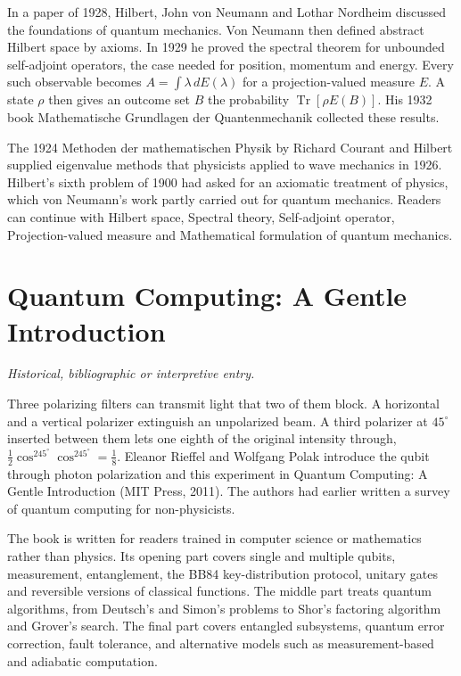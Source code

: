 \documentclass[11pt,oneside]{book}
\begin{document}
In a paper of 1928, Hilbert, John von Neumann and Lothar Nordheim discussed the foundations of quantum mechanics. Von Neumann then defined abstract Hilbert space by axioms. In 1929 he proved the spectral theorem for unbounded self-adjoint operators, the case needed for position, momentum and energy. Every such observable becomes \(A=\int\lambda\,dE(\lambda)\) for a projection-valued measure \(E\). A state \(\rho\) then gives an outcome set \(B\) the probability \(\operatorname{Tr}[\rho E(B)]\). His 1932 book Mathematische Grundlagen der Quantenmechanik collected these results.

The 1924 Methoden der mathematischen Physik by Richard Courant and Hilbert supplied eigenvalue methods that physicists applied to wave mechanics in 1926. Hilbert's sixth problem of 1900 had asked for an axiomatic treatment of physics, which von Neumann's work partly carried out for quantum mechanics. Readers can continue with Hilbert space, Spectral theory, Self-adjoint operator, Projection-valued measure and Mathematical formulation of quantum mechanics.







\clearpage

\section{Quantum Computing: A Gentle Introduction}

\label{topic:quantum-computing-a-gentle-introduction}

\par\smallskip\noindent\textit{Historical, bibliographic or interpretive entry.}

Three polarizing filters can transmit light that two of them block. A horizontal and a vertical polarizer extinguish an unpolarized beam. A third polarizer at \(45^\circ\) inserted between them lets one eighth of the original intensity through, \(\tfrac12\cos^245^\circ\cos^245^\circ=\tfrac18\). Eleanor Rieffel and Wolfgang Polak introduce the qubit through photon polarization and this experiment in Quantum Computing: A Gentle Introduction (MIT Press, 2011). The authors had earlier written a survey of quantum computing for non-physicists.

The book is written for readers trained in computer science or mathematics rather than physics. Its opening part covers single and multiple qubits, measurement, entanglement, the BB84 key-distribution protocol, unitary gates and reversible versions of classical functions. The middle part treats quantum algorithms, from Deutsch's and Simon's problems to Shor's factoring algorithm and Grover's search. The final part covers entangled subsystems, quantum error correction, fault tolerance, and alternative models such as measurement-based and adiabatic computation.
\end{document}
